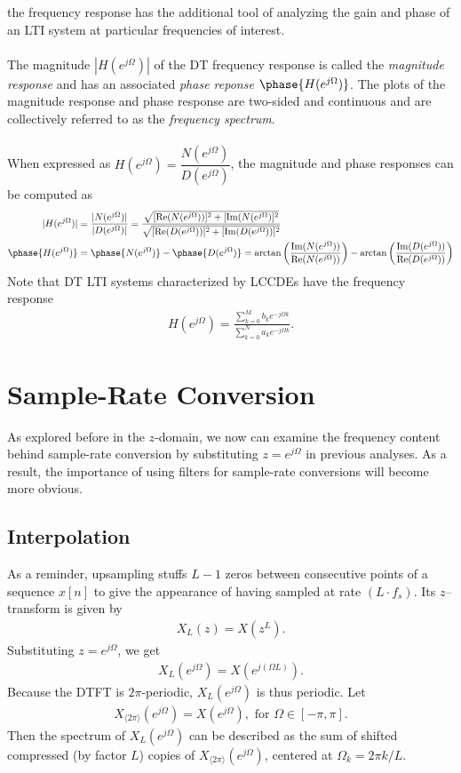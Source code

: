 \documentclass{report}
\begin{document}
the frequency response has the additional tool of analyzing the gain and phase of an LTI system at particular 
frequencies of interest. 
\\ \\
The magnitude $|H(e^{j\Omega})|$ of the DT frequency response is called the \emph{magnitude response} and has an associated \emph{phase reponse} $\phase{H(e^{j\Omega})}$. 
The plots of the magnitude response and phase response are two-sided and continuous and are collectively referred to as the \emph{frequency spectrum}. 
\\ \\ 
When expressed as $H(e^{j\Omega})=\dfrac{N(e^{j\Omega})}{D(e^{j\Omega})}$, the magnitude and phase responses can be computed as 
\begin{align}
    |H(e^{j\Omega})| &= \frac{|N(e^{j\Omega})|}{|D(e^{j\Omega})|} = \frac{\sqrt{[\Re(N(e^{j\Omega}))]^2 + [\Im(N(e^{j\Omega})]^2}}{\sqrt{[\Re(D(e^{j\Omega}))]^2 + [\Im(D(e^{j\Omega}))]^2}} \\
    \phase{H(e^{j\Omega})} &=  \phase{N(e^{j\Omega})} -  \phase{D(e^{j\Omega})} = \arctan\left(\frac{\Im(N(e^{j\Omega}))}{\Re(N(e^{j\Omega}))}\right) - \arctan\left(\frac{\Im(D(e^{j\Omega}))}{\Re(D(e^{j\Omega}))}\right)
\end{align}
Note that DT LTI systems characterized by LCCDEs have the frequency response 
\begin{align}
    H(e^{j\Omega}) = \frac{\displaystyle\sum_{k=0}^{M} b_k e^{-j\Omega k}}{\displaystyle\sum_{k=0}^{N} a_k e^{-j\Omega k}}.
\end{align}

\pagebreak
\section{Sample-Rate Conversion}
As explored before in the $z$-domain, we now can examine the frequency content behind sample-rate conversion by substituting $z=e^{j\Omega}$ in previous analyses. 
As a result, the importance of using filters for sample-rate conversions will become more obvious.

\subsection{Interpolation}
As a reminder, upsampling stuffs $L-1$ zeros between consecutive points of a sequence $x[n]$ to give the appearance of having sampled at rate $(L\cdot f_s)$. Its $z$--transform is 
given by
\begin{align}
    X_L(z) = X(z^L).
\end{align}
Substituting $z=e^{j\Omega}$, we get 
\begin{align}
    X_L(e^{j\Omega}) = X(e^{j(\Omega L)}).
\end{align}
Because the DTFT is $2\pi$-periodic, $X_L(e^{j\Omega})$ is thus periodic. Let 
\begin{align}
    X_{\langle2\pi\rangle}(e^{j\Omega}) = X(e^{j\Omega}), \text{ for } \Omega\in[-\pi,\pi].
\end{align}
Then the spectrum of $X_L(e^{j\Omega})$ can be described as the sum of shifted 
compressed (by factor $L$) copies of $X_{\langle2\pi\rangle}(e^{j\Omega})$, centered at $\Omega_k = 2\pi k/L$.
\end{document}
